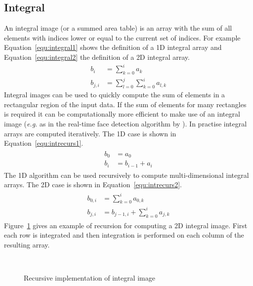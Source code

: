 \documentclass[12pt,a4paper,oneside,openright]{book}
\newcommand{\eg}{\emph{e.g.} }
\newcommand{\Eg}{For ex\-am\-ple }
\newcommand{\equ}[1]{Equation~\ref{equ:#1}}
\newcommand{\fig}[1]{Figure~\ref{fig:#1}}
\begin{document}
\begin{CJK}{UTF8}{}
\subsection{Integral}\label{cha:integral}
An integral image (or a summed area table) is an array with the sum of all elements with indices lower or equal to the current set of indices. \Eg \equ{integral1} shows the definition of a \ac{1D} integral array and \equ{integral2} the definition of a \ac{2D} integral array.
\begin{align}
  b_i&=\displaystyle\sum_{k=0}^ia_k\label{equ:integral1}\\
  b_{j,i}&=\displaystyle\sum_{l=0}^j\sum_{k=0}^ia_{l,k}\label{equ:integral2}
\end{align}
Integral images can be used to quickly compute the sum of elements in a rectangular region of the input data. If the sum of elements for many rectangles is required it can be computationally more efficient to make use of an integral image (\eg as in the real-time face detection algorithm by \citet{Viola01robustreal-time}). In practise integral arrays are computed iteratively. The \ac{1D} case is shown in \equ{intrecurs1}.
\begin{align}\label{equ:intrecurs1}
  \begin{split}
    b_0&=a_0\\
    b_i&=b_{i-1}+a_i
  \end{split}
\end{align}
The \ac{1D} algorithm can be used recursively to compute multi-dimensional integral arrays. The \ac{2D} case is shown in \equ{intrecurs2}.
\begin{align}\label{equ:intrecurs2}
  \begin{split}
    b_{0,i}&=\displaystyle\sum_{k=0}^ia_{0,k}\\
    b_{j,i}&=b_{j-1,i}+\displaystyle\sum_{k=0}^ia_{j,k}
  \end{split}
\end{align}
\fig{integrate} gives an example of recursion for computing a \ac{2D} integral image. First each row is integrated and then integration is performed on each column of the resulting array.
\begin{figure}[htbp]
   \begin{center}
     \\
     \caption{Recursive implementation of integral image\label{fig:integrate}}
   \end{center}
\end{figure}


\end{CJK}
\end{document}

